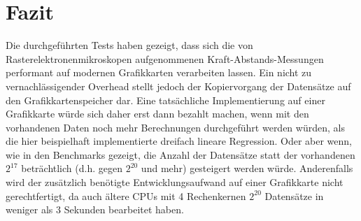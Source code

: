 %
%
%    
%
%
%    


\chapter{Fazit}
Die durchgeführten Tests haben gezeigt, dass sich die von Rasterelektronenmikroskopen aufgenommenen Kraft-Abstands-Messungen performant auf modernen Grafikkarten verarbeiten lassen.
Ein nicht zu vernachlässigender Overhead stellt jedoch der Kopiervorgang der Datensätze auf den Grafikkartenspeicher dar. Eine tatsächliche Implementierung auf einer Grafikkarte würde sich daher erst dann bezahlt machen, wenn mit den vorhandenen Daten noch mehr Berechnungen durchgeführt werden würden, als die hier beispielhaft implementierte dreifach lineare Regression. Oder aber wenn, wie in den Benchmarks gezeigt, die Anzahl der Datensätze statt der vorhandenen $2^{17}$ beträchtlich (d.h. gegen $2^{20}$ und mehr) gesteigert werden würde.
Anderenfalls wird der zusätzlich benötigte Entwicklungsaufwand auf einer Grafikkarte nicht gerechtfertigt, da auch ältere CPUs mit 4 Rechenkernen $2^{20}$ Datensätze in weniger als 3 Sekunden bearbeitet haben.
